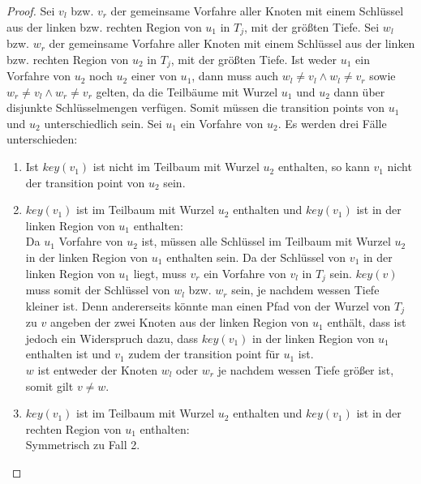 \documentclass[a4paper,12pt]{article}
\begin{document}
\begin{proof}
	Sei $v_l$ bzw. $v_r$ der gemeinsame Vorfahre aller Knoten mit einem Schlüssel aus der linken bzw. rechten Region von $u_1$ in $T_j$, mit der größten Tiefe.  Sei $w_l$ bzw. $w_r$ der gemeinsame Vorfahre aller Knoten mit einem Schlüssel aus der linken bzw. rechten Region von $u_2$ in $T_j$, mit der größten Tiefe. Ist weder $u_1$ ein Vorfahre von $u_2$ noch $u_2$ einer von $u_1$, dann muss auch $w_l \ne v_l \land w_l \ne v_r$ sowie $w_r \ne v_l \land w_r \ne v_r$ gelten, da die Teilbäume mit Wurzel $u_1$ und $u_2$ dann über disjunkte Schlüsselmengen verfügen. Somit müssen die transition points von $u_1$ und $u_2$ unterschiedlich sein. Sei $u_1$ ein Vorfahre von $u_2$. Es werden drei Fälle unterschieden:
	\begin{enumerate}
		\item Ist $\mathit{key}\left(v_1\right)$ ist nicht im Teilbaum mit Wurzel $u_2$ enthalten, so kann $v_1$ nicht der transition point von $u_2$ sein.
		\item $\mathit{key}\left(v_1\right)$ ist im Teilbaum mit Wurzel $u_2$ enthalten und $\mathit{key}\left(v_1\right)$ ist  in der linken Region von $u_1$ enthalten:\\
		Da $u_1$ Vorfahre von $u_2$ ist, müssen alle Schlüssel im Teilbaum mit Wurzel $u_2$ in der linken Region von $u_1$ enthalten sein. Da der Schlüssel von $v_1$ in der linken Region von $u_1$ liegt, muss $v_r$ ein Vorfahre von $v_l$ in $T_j$ sein. $\mathit{key}\left(v\right)$ muss somit der Schlüssel von $w_l$ bzw. $w_r$ sein, je nachdem wessen Tiefe kleiner ist. Denn andererseits könnte man einen Pfad von der Wurzel von $T_j$ zu $v$ angeben der zwei Knoten aus der linken Region von $u_1$ enthält, dass ist jedoch ein Widerspruch dazu, dass  $\mathit{key}\left(v_1\right)$ in der linken Region von $u_1$ enthalten ist und $v_1$ zudem der transition point für $u_1$ ist.\\
		$w$ ist entweder der Knoten $w_l$ oder $w_r$ je nachdem wessen Tiefe größer ist, somit gilt $v \ne w$.
		\item $\mathit{key}\left(v_1\right)$ ist im Teilbaum mit Wurzel $u_2$ enthalten und $\mathit{key}\left(v_1\right)$ ist in der rechten Region von $u_1$ enthalten:\\
		Symmetrisch zu Fall 2.
	\end{enumerate}
	
	
	
	
	
	
\end{proof}
\end{document}
